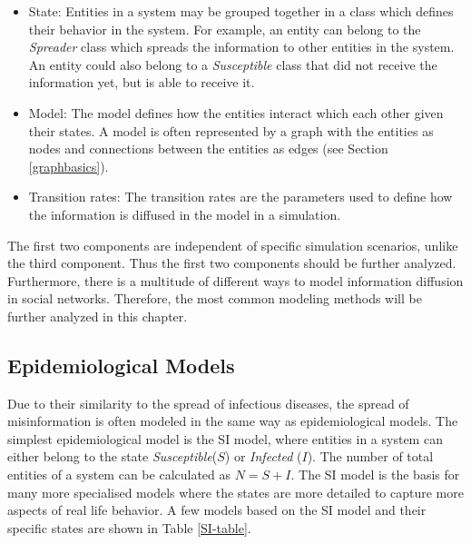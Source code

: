 \begin{itemize}
    \item State: Entities in a system may be grouped together in a class which
    defines their behavior in the system. For example, 
    an entity can belong to the \textit{Spreader} class which 
    spreads the information
    to other entities in the system. An entity could also belong to a
    \textit{Susceptible} class that did not receive the information yet, 
    but is able to receive it.
    \item Model: The model defines how the entities interact which each other
    given their states. A model is often represented by a graph with the entities
    as nodes and connections between the entities as edges 
    (see Section \ref{graphbasics}).
    \item Transition rates: The transition rates are the parameters used
    to define how the information is diffused in the model in a simulation. 
\end{itemize}

The first two components are independent of specific simulation scenarios,
unlike the third component. Thus the first two components should be further
analyzed. Furthermore, there is a multitude of different ways 
to model information diffusion in social networks. Therefore, the most common
modeling methods will be further analyzed in this chapter.

\subsection{Epidemiological Models}
\label{epidemologicalmodels}

Due to their similarity to the spread of infectious diseases, 
the spread of misinformation is often modeled in the same way as epidemiological models.
The simplest epidemiological model is the SI model, where entities in a system
can either belong to the state \textit{Susceptible}($S$) or 
\textit{Infected} ($I$). The number of total entities of a 
system can be calculated as $N=S+I$. The SI model is the basis for many
more specialised models where the states are more detailed to capture more 
aspects of real life behavior. A few models based on the SI model and their 
specific states are shown in Table \ref{SI-table}.

